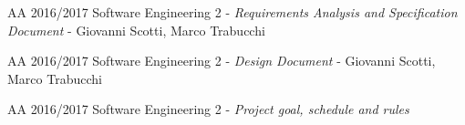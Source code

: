 \begin{thebibliography}{9}

	AA 2016/2017 Software Engineering 2 - \emph{Requirements Analysis and Specification Document} - Giovanni Scotti, Marco Trabucchi

	AA 2016/2017 Software Engineering 2 - \emph{Design Document} - Giovanni Scotti, Marco Trabucchi
	
	AA 2016/2017 Software Engineering 2 - \emph{Project goal, schedule and rules}
	

\end{thebibliography}